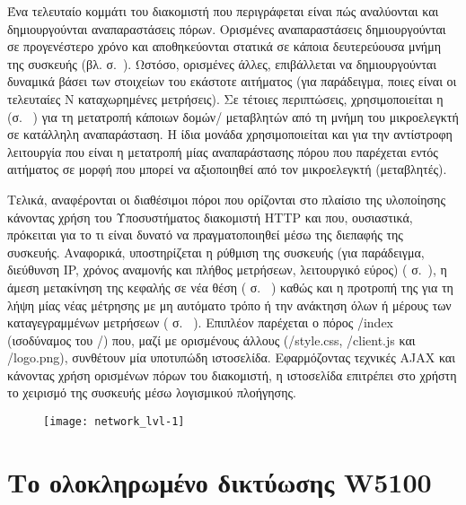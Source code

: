 Ένα τελευταίο κομμάτι του διακομιστή που περιγράφεται είναι πώς αναλύονται και
δημιουργούνται αναπαραστάσεις πόρων. Ορισμένες αναπαραστάσεις δημιουργούνται σε
προγενέστερο χρόνο και αποθηκεύονται στατικά σε κάποια δευτερεύουσα μνήμη της
συσκευής (βλ.  σ.~\pageref{subsec:network:files}).
Ωστόσο, ορισμένες άλλες, επιβάλλεται να δημιουργούνται δυναμικά βάσει των
στοιχείων του εκάστοτε αιτήματος (για παράδειγμα, ποιες είναι οι τελευταίες N
καταχωρημένες μετρήσεις). Σε τέτοιες περιπτώσεις, χρησιμοποιείται η
 (σ.~%
\pageref{subsec:network:representation}) για τη μετατροπή κάποιων δομών\slash{}%
μεταβλητών από τη μνήμη του μικροελεγκτή σε κατάλληλη αναπαράσταση. Η ίδια
μονάδα χρησιμοποιείται και για την αντίστροφη λειτουργία που είναι η μετατροπή
μίας αναπαράστασης πόρου που παρέχεται εντός αιτήματος σε μορφή που μπορεί να
αξιοποιηθεί από τον μικροελεγκτή (μεταβλητές).

Τελικά, αναφέρονται οι διαθέσιμοι πόροι που ορίζονται στο πλαίσιο της υλοποίησης
κάνοντας χρήση του Υποσυστήματος διακομιστή HTTP και που, ουσιαστικά, πρόκειται
για το τι είναι δυνατό να πραγματοποιηθεί μέσω της διεπαφής της συσκευής.
Αναφορικά, υποστηρίζεται η ρύθμιση της συσκευής (για παράδειγμα, διεύθυνση IP,
χρόνος αναμονής και πλήθος μετρήσεων, λειτουργικό εύρος)
( σ.~\pageref{subsec:network:config}), η άμεση
μετακίνηση της κεφαλής σε νέα θέση ( σ.~%
\pageref{subsec:network:coordinates}) καθώς και η προτροπή της για τη λήψη μίας
νέας μέτρησης με μη αυτόματο τρόπο ή την ανάκτηση όλων ή μέρους των
καταγεγραμμένων μετρήσεων ( σ.~%
\pageref{subsec:network:measurement}). Επιπλέον παρέχεται ο πόρος /index
(ισοδύναμος του /) που, μαζί με ορισμένους άλλους (/style.css, /client.js και
/logo.png), συνθέτουν μία υποτυπώδη ιστοσελίδα. Εφαρμόζοντας τεχνικές AJAX και
κάνοντας χρήση ορισμένων πόρων του διακομιστή, η ιστοσελίδα επιτρέπει στο χρήστη
το χειρισμό της συσκευής μέσω λογισμικού πλοήγησης.

\begin{figure}
    \caption{
    \label{fig:network:lvl-1}}
    \begin{center}
    \texttt{[image: network\_lvl-1]}
    \end{center}
\end{figure}


\section{Το ολοκληρωμένο δικτύωσης W5100}
\label{sec:w5100}

